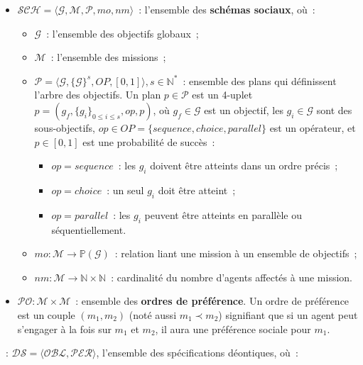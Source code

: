 \begin{itemize}
    \item $\mathcal{SCH} = \langle\mathcal{G}, \mathcal{M}, \mathcal{P}, mo, nm \rangle$~: l'ensemble des \textbf{schémas sociaux}, où~:
          \begin{itemize}
              \item $\mathcal{G}$~: l'ensemble des objectifs globaux~;
              \item $\mathcal{M}$~: l'ensemble des missions~;
              \item $\mathcal{P} = \langle \mathcal{G}, \{\mathcal{G}\}^s, OP, [0,1] \rangle, s \in \mathbb{N}^*$~: ensemble des plans qui définissent l'arbre des objectifs.
                    Un plan $p \in \mathcal{P}$ est un 4-uplet $p = (g_f, \{g_i\}_{0 \leq i \leq s}, op, p)$, où $g_f \in \mathcal{G}$ est un objectif, les $g_i \in \mathcal{G}$ sont des sous-objectifs, $op \in OP = \{sequence, choice, parallel\}$ est un opérateur, et $p \in [0,1]$ est une probabilité de succès~:
                    \begin{itemize}
                        \item $op = sequence$~: les $g_i$ doivent être atteints dans un ordre précis~;
                        \item $op = choice$~: un seul $g_i$ doit être atteint~;
                        \item $op = parallel$~: les $g_i$ peuvent être atteints en parallèle ou séquentiellement.
                    \end{itemize}
              \item $mo: \mathcal{M} \rightarrow \mathbb{P}(\mathcal{G})$~: relation liant une mission à un ensemble de objectifs~;
              \item $nm: \mathcal{M} \rightarrow \mathbb{N} \times \mathbb{N}$~: cardinalité du nombre d'agents affectés à une mission.
          \end{itemize}
    \item $\mathcal{PO}: \mathcal{M} \times \mathcal{M}$~: ensemble des \textbf{ordres de préférence}. Un ordre de préférence est un couple $(m_1, m_2)$ (noté aussi $m_1 \prec m_2$) signifiant que si un agent peut s'engager à la fois sur $m_1$ et $m_2$, il aura une préférence sociale pour $m_1$.
\end{itemize}

\medskip

\noindent \textbf{}~: \quad $\mathcal{DS} = \langle \mathcal{OBL}, \mathcal{PER} \rangle$, l'ensemble des spécifications déontiques, où~:

